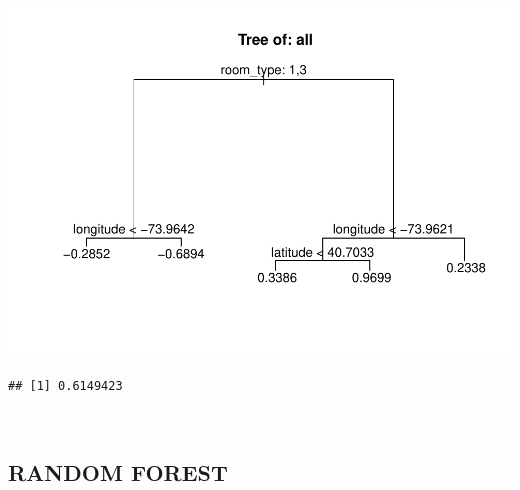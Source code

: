 \documentclass[
]{article}
\newenvironment{Shaded}{\begin{snugshade}}{\end{snugshade}}
\newcommand{\NormalTok}[1]{#1}
\newcommand{\OperatorTok}[1]{\textcolor[rgb]{0.81,0.36,0.00}{\textbf{#1}}}
\newcommand{\StringTok}[1]{\textcolor[rgb]{0.31,0.60,0.02}{#1}}
\begin{document}
\includegraphics{project-code_files/figure-latex/unnamed-chunk-14-20.pdf}

\begin{verbatim}
## [1] 0.6149423
\end{verbatim}

\begin{Shaded}
\end{Shaded}

~\\

\hypertarget{random-forest}{%
\subsection{RANDOM FOREST}\label{random-forest}}
\end{document}

